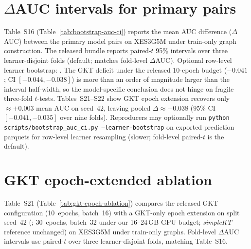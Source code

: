 \documentclass[pdflatex,sn-mathphys-num]{sn-jnl}
\begin{document}
\section{$\Delta$AUC intervals for primary pairs}
\label{sec:supp-bootstrap}
Table~S16 (Table~\ref{tab:bootstrap-auc-ci}) reports the mean AUC difference
($\Delta$AUC) between the primary model pairs on XES3G5M under train-only
graph construction. The released bundle reports paired-$t$ 95\% intervals
over three learner-disjoint folds (default; matches fold-level
$\Delta$AUC). Optional row-level learner bootstrap:
.
The GKT deficit under the released 10-epoch budget ($-0.041$; CI $[-0.044,-0.038]$) is more than an order of
magnitude larger than the interval half-width, so the model-specific conclusion
does not hinge on fragile three-fold $t$-tests. Tables~S21--S22 show GKT
epoch extension recovers only ${\approx}+0.003$ mean AUC on seed~$42$, leaving pooled
$\Delta{\approx}-0.038$ (95\% CI $[-0.041,-0.035]$ over nine folds). Reproducers may optionally run
\texttt{python scripts/bootstrap\_auc\_ci.py --learner-bootstrap} on exported
prediction parquets for row-level learner resampling (slower; fold-level
paired-$t$ is the default).
\begin{table}[h!]
\centering
\caption{$\Delta$AUC intervals for primary pairs, XES3G5M, train-only graphs (Table S16)}
\label{tab:bootstrap-auc-ci}

\end{table}

\section{GKT epoch-extended ablation}
\label{sec:supp-gkt-epoch}
Table~S21 (Table~\ref{tab:gkt-epoch-ablation}) compares the released GKT
configuration (10~epochs, batch~16) with a GKT-only epoch extension on split
seed~$42$ (; 30~epochs, batch~32 under
our 16--24\,GB GPU budget; \textit{simpleKT} reference unchanged) on XES3G5M
under train-only graphs. Fold-level
$\Delta$AUC intervals use paired-$t$ over three learner-disjoint folds,
matching Table~S16.
\begin{table}[h!]
\centering
\caption{GKT epoch-extended ablation on XES3G5M, split seed~$42$ (Table S21)}
\label{tab:gkt-epoch-ablation}

\end{table}
\end{document}
